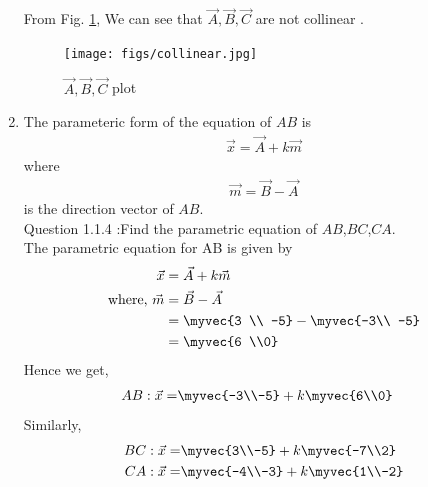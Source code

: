 \documentclass[11pt]{book}
\begin{document}
\begin{enumerate}[label=\thesection.\arabic*.,ref=\thesection.\theenumi]
From Fig. \ref{fig1:Triangle}, We can see that $\vec{A},\vec{B},\vec{C}$ are not collinear .
\begin{figure}[h]
\centering
\texttt{[image: figs/collinear.jpg]}
\caption{$\vec{A},\vec{B},\vec{C}$ plot}
\label{fig1:Triangle}
\end{figure}



\item The parameteric form of the equation  of $AB$ is 
		\begin{align}
			\vec{x}=\vec{A}+k\vec{m}
		\end{align}
		where
		\begin{align}
\vec{m}=\vec{B}-\vec{A}
		\end{align}
is the direction vector of $AB$.\\
Question 1.1.4 :Find the parametric equation of $AB$,$BC$,$CA$.\\
\solution
The parametric equation for AB is given by
\begin{align}
\vec{x} &= \vec{A} + k\vec{m}\\
\text{where, } \vec{m} &= \vec{B} -\vec{A}\\
&= \myvec{3 \\ -5} -\myvec{-3\\ -5}\\
&= \myvec{6 \\0}
\end{align}
Hence we get,
\begin{align}
AB: \vec{x} = &\myvec{-3\\-5} + k \myvec{6\\0}
\end{align}
Similarly, 
\begin{align}
BC: \vec{x} = &\myvec{3\\-5} + k \myvec{-7\\2}\\
CA: \vec{x} = &\myvec{-4\\-3} + k \myvec{1\\-2}
\end{align}



\end{enumerate}
\end{document}
